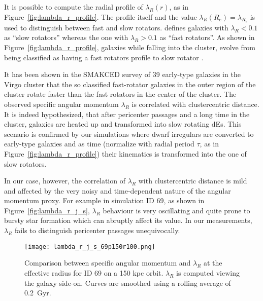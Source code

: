 It is possible to compute the radial profile of $\lambda_R(r)$, as in Figure~\ref{fig:lambda_r_profile}.
The profile itself and the value $\lambda_R(R_e) = \lambda_{R_e}$ is used to distinguish between fast and slow rotators.
\citet{Emsellem2007} defines galaxies with $\lambda_R < 0.1$ as ``slow rotators'' whereas the one with $\lambda_R>0.1$ as ``fast rotators''.
As shown in Figure~\ref{fig:lambda_r_profile}, galaxies while falling into the cluster, evolve from being classified as having a fast rotators profile to slow rotator \citep[cf.][]{Emsellem2011}.


It has been shown in the \textsc{SMAKCED} survey of 39 early-type galaxies in the Virgo cluster \citep{Toloba2014, Toloba2015} that the so classified fast-rotator galaxies in the outer region of the cluster rotate faster than the fast rotators in the center of the cluster.
The observed specific angular momentum $\lambda_R$ is correlated with clustercentric distance. %
It is indeed hypothesized, that after pericenter passages and a long time in the cluster, galaxies are heated up and transformed into slow rotating dEs.
This scenario is confirmed by our simulations where dwarf irregulars are converted to early-type galaxies and as time (normalize with radial period $\tau$, as in Figure~\ref{fig:lambda_r_profile}) their kinematics is transformed into the one of slow rotators.

In our case, however, the correlation of $\lambda_R$ with clustercentric distance is mild and affected by the very noisy and time-dependent nature of the angular momentum proxy.
For example in simulation ID 69, as shown in Figure~\ref{fig:lambda_r_j_s}, $\lambda_R$ behaviour is very oscillating and quite prone to bursty star formation which can abruptly affect its value.
In our measurements, $\lambda_R$ fails to distinguish pericenter passages unequivocally.

\begin{figure}
\centering
\texttt{[image: lambda\_r\_j\_s\_69p150r100.png]}
\caption{Comparison between specific angular momentum and $\lambda_R$ at the effective radius for ID 69 on a 150 kpc orbit.
$\lambda_R$ is computed viewing the galaxy side-on.
Curves are smoothed using a rolling average of 0.2~Gyr.}
\label{fig:lambda_r_j_s_sigma}
\end{figure}

